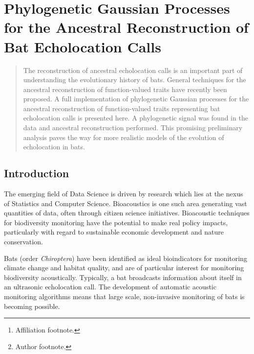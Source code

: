 \documentclass{ws-rv9x6}
\begin{document}
\chapter[Ancestral Reconstruction of Bat Echolocation Calls]{Phylogenetic Gaussian Processes for the Ancestral Reconstruction of Bat Echolocation Calls}\label{ra_ch1}

\author[J.P. Meagher et al.]{J.P. Meagher, T. Damoulas, K.E. Jones, and M. Girolami\footnote{Author footnote.}}

\address{Department of Statistics,\\
University of Warwick, \\
J.Meagher@Warwick.ac.uk\footnote{Affiliation footnote.}}

\begin{abstract}
The reconstruction of ancestral echolocation calls is an important part of understanding the evolutionary history of bats. General techniques for the ancestral reconstruction of function-valued traits have recently been proposed. A full implementation of phylogenetic Gaussian processes for the ancestral reconstruction of function-valued traits representing bat echolocation calls is presented here. A phylogenetic signal was found in the data and ancestral reconstruction performed. This promising preliminary analysis paves the way for more realistic models of the evolution of echolocation in bats.
\end{abstract}
\body

\section{Introduction}
\label{sec:intro}
The emerging field of Data Science is driven by research which lies at the nexus of Statistics and Computer Science. Bioacoustics is one such area generating vast quantities of data, often through citizen science initiatives. \cite{allen2006citizen} \cite{pettorelli2013indicator} Bioacoustic techniques for biodiversity monitoring \cite{stathopoulos2017bat} \cite{damoulas2010bayesian} have the potential to make real policy impacts, particularly with regard to sustainable economic development and nature conservation.

Bats (order \textit{Chiroptera}) have been identified as ideal bioindicators for monitoring climate change and habitat quality,\cite{jones2009carpe} and are of particular interest for monitoring biodiversity acoustically. Typically, a bat broadcasts information about itself in an ultrasonic echolocation call.\cite{griffin1944echolocation} The development of automatic acoustic monitoring algorithms \cite{stathopoulos2017bat} \cite{walters2012continental} means that large scale, non-invasive monitoring of bats is becoming possible.   
\end{document}
